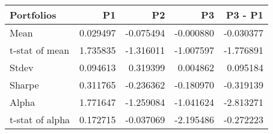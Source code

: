 \begin{tabular}{lrrrr}
\toprule
Portfolios & P1 & P2 & P3 & P3 - P1 \\
\midrule
Mean & 0.029497 & -0.075494 & -0.000880 & -0.030377 \\
t-stat of mean & 1.735835 & -1.316011 & -1.007597 & -1.776891 \\
Stdev & 0.094613 & 0.319399 & 0.004862 & 0.095184 \\
Sharpe & 0.311765 & -0.236362 & -0.180970 & -0.319139 \\
Alpha & 1.771647 & -1.259084 & -1.041624 & -2.813271 \\
t-stat of alpha & 0.172715 & -0.037069 & -2.195486 & -0.272223 \\
\bottomrule
\end{tabular}
